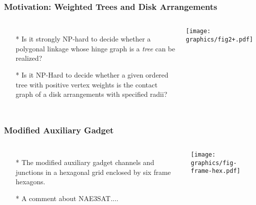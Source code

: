 \documentclass{beamer}
\begin{document}
\begin{frame}\frametitle{Motivation: Weighted Trees and Disk Arrangements}
    \begin{columns}[c]
        \begin{itemize}
            \item[*] Is it strongly NP-hard to decide whether a polygonal linkage whose hinge graph is a \textit{tree} can be realized? 
            \item[*] Is it NP-Hard to decide whether a given ordered tree with positive vertex weights is the contact graph of a disk arrangements with specified radii?
        \end{itemize}
        \begin{minipage}{\linewidth}
            \begin{center}
            \texttt{[image: graphics/fig2+.pdf]}
            \label{gfx:fig1+.pdf}
            \end{center}
        \end{minipage}
    \end{columns}
\end{frame}

\begin{frame} \frametitle{Modified Auxiliary Gadget}
    \begin{columns}[c]
        \begin{itemize}
            \item[*] The modified auxiliary gadget channels and junctions in a hexagonal grid enclosed by six frame hexagons.
            \item[*] A comment about NAE3SAT....
        \end{itemize}
        \begin{minipage}{\linewidth}
            \begin{center}
            \texttt{[image: graphics/fig-frame-hex.pdf]}
            \label{gfx:fig-frame-hex.pdf}
            \end{center}
        \end{minipage}
    \end{columns}
\end{frame}
\end{document}
